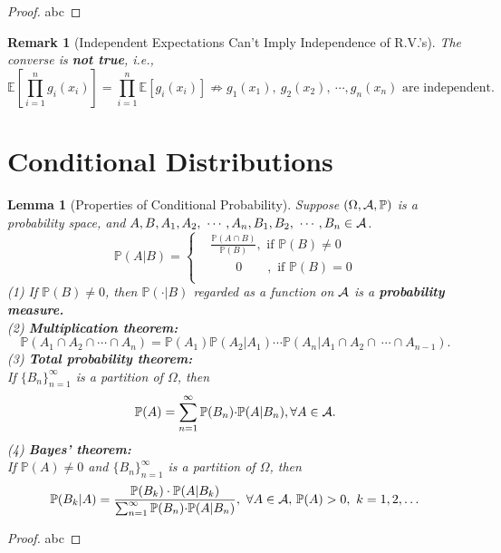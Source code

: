 \documentclass[openany,12pt]{book}
\newtheorem{remark}{Remark}[chapter]
\newtheorem{lemma}{Lemma}[chapter]
\begin{document}
\begin{proof}
  abc
\end{proof}

\begin{remark}[Independent Expectations Can't Imply Independence of R.V.'s]
The converse is \textbf{not true}, i.e.,
\[\mathbb{E}\left[ \prod_{i = 1}^{n}{g_{i}(x_{i})} \right] = \prod_{i = 1}^{n}{\mathbb{E}[ g_{i}(x_{i})]} \nRightarrow g_{1}(x_{1}),\ g_{2}(x_{2}),\ \cdots, g_{n}(x_{n})\mathrm{\text{\ are\ independent.}}\]
\end{remark}

\section{Conditional Distributions}

\begin{lemma}[Properties of Conditional Probability]
Suppose $(\Omega,\mathcal{A},\mathbb{P})$ is a probability space, and $A,B,A_{1},A_{2},\ \cdots,A_{n},B_{1},B_{2},\ \cdots,B_{n} \in \ma$.
\[\mathbb{P}( A | B ) = \left\{ \begin{aligned}
&\frac{\mathbb{P}(A  \cap B)}{\mathbb{P}(B)},\mathrm{\text{\ if\ }}\mathbb{P}( B ) \neq 0\\
&\qquad0\qquad,\mathrm{\text{\ if\ }}\mathbb{P}( B ) = 0 \\
\end{aligned} \right.\]
(1) If $\mathbb{P}(B) \neq 0$, then $\mathbb{P}(\cdot | B)$ regarded as a function on $\mathcal{A}$ is a \textbf{probability} \textbf{measure.}\\
(2) \textbf{Multiplication theorem:}
\[\mathbb{P}( A_{1}\cap{A_{2}\cap{\cdots\cap A_{n}}} ) = \mathbb{P}( A_{1} )\mathbb{P}( A_{2} | A_{1} ) \cdots \mathbb{P}(A_{n}|A_{1}\cap{A_{2}\cap{\  \cdots\cap A_{n - 1}}}).\]
(3) \textbf{Total probability theorem:}\\
If ${\{ B_{n}\}}_{n = 1}^{\infty}$ is a partition of $\Omega$, then
\[\mathbb{P}(A) = \sum_{n = 1}^{\infty}{\mathbb{P}(B_{n}) \cdot}\mathbb{P}(A|B_{n}),\forall A \in \mathcal{A}.\]
(4) \textbf{Bayes' theorem:}\\
If $\mathbb{P}(A) \neq 0$ and ${\{ B_{n}\}}_{n = 1}^{\infty}$ is
a partition of $\Omega$, then
\[\mathbb{P}(B_{k} | A) = \frac{\mathbb{P}(B_{k}) \cdot \mathbb{P}(A|B_{k})}{\sum_{n = 1}^{\infty}{\mathbb{P}(B_{n}) \cdot}\mathbb{P}( A | B_{n} )},\ \forall A \in \mathcal{A}\mathrm{,\ }\mathbb{P}(A) > 0,\ k = 1,2,\dots\]
\end{lemma}

\begin{proof}
  abc
\end{proof}
\end{document}
